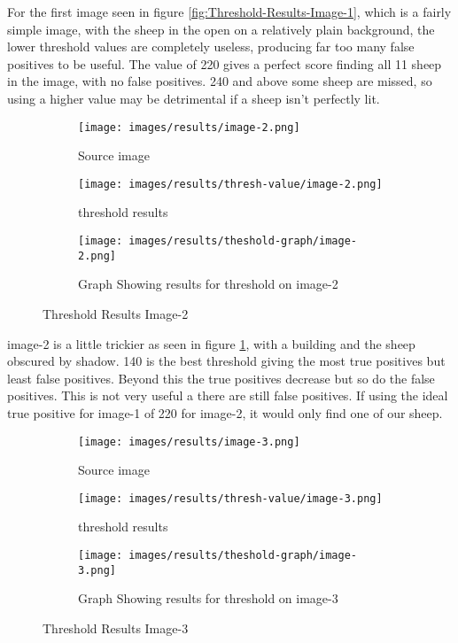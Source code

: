 For the first image seen in figure \ref{fig:Threshold-Results-Image-1}, which is a fairly simple image, with the sheep in the open on a relatively plain background, the lower threshold values are completely useless, producing far too many false positives to be useful. The value of 220 gives a perfect score finding all 11 sheep in the image, with no false positives. 240 and above some sheep are missed, so using a higher value may be detrimental if a sheep isn't perfectly lit. 

\begin{figure}[H]
    \centering

\begin{subfigure}{.5\textwidth}
    \centering
    \texttt{[image: images/results/image-2.png]}
    \caption{Source image}

\end{subfigure}%
\begin{subfigure}{.5\textwidth}
\centering
    \texttt{[image: images/results/thresh-value/image-2.png]}
    \caption{threshold results}

\end{subfigure}
\begin{subfigure}{.9\textwidth}
\centering
    \texttt{[image: images/results/theshold-graph/image-2.png]}
    \caption{Graph Showing results for threshold on image-2}
\end{subfigure}%

    \caption{Threshold Results Image-2}
    \label{fig:Threshold-Results-Image-2}
\end{figure}

image-2 is a little trickier as seen in figure \ref{fig:Threshold-Results-Image-2}, with a building and the sheep obscured by shadow. 140 is the best threshold giving the most true positives but least false positives. Beyond this the true positives decrease but so do the false positives. This is not very useful a there are still false positives. If using the ideal true positive for image-1 of 220 for image-2, it would only find one of our sheep.

\begin{figure}[H]
    \centering

\begin{subfigure}{.5\textwidth}
    \centering
    \texttt{[image: images/results/image-3.png]}
    \caption{Source image}

\end{subfigure}%
\begin{subfigure}{.5\textwidth}
\centering
    \texttt{[image: images/results/thresh-value/image-3.png]}
    \caption{threshold results}

\end{subfigure}
\begin{subfigure}{.9\textwidth}
\centering
    \texttt{[image: images/results/theshold-graph/image-3.png]}
    \caption{Graph Showing results for threshold on image-3}
\end{subfigure}%

    \caption{Threshold Results Image-3}
    \label{fig:Threshold-Results-Image-3}
\end{figure}

